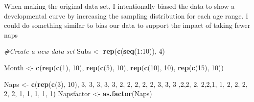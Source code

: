 \documentclass[]{book}
\newenvironment{Shaded}{\begin{snugshade}}{\end{snugshade}}
\newcommand{\CommentTok}[1]{\textcolor[rgb]{0.56,0.35,0.01}{\textit{#1}}}
\newcommand{\DecValTok}[1]{\textcolor[rgb]{0.00,0.00,0.81}{#1}}
\newcommand{\KeywordTok}[1]{\textcolor[rgb]{0.13,0.29,0.53}{\textbf{#1}}}
\newcommand{\NormalTok}[1]{#1}
\newcommand{\OperatorTok}[1]{\textcolor[rgb]{0.81,0.36,0.00}{\textbf{#1}}}
\newcommand{\StringTok}[1]{\textcolor[rgb]{0.31,0.60,0.02}{#1}}
\begin{document}
When making the original data set, I intentionally biased the data to show a developmental curve by increasing the sampling distribution for each age range. I could do something similar to bias our data to support the impact of taking fewer naps

\begin{Shaded}
\begin{Highlighting}[]
\CommentTok{#Create a new data set }
\NormalTok{Subs <-}\StringTok{ }\KeywordTok{rep}\NormalTok{(}\KeywordTok{c}\NormalTok{(}\KeywordTok{seq}\NormalTok{(}\DecValTok{1}\OperatorTok{:}\DecValTok{10}\NormalTok{)), }\DecValTok{4}\NormalTok{)}

\NormalTok{Month <-}\StringTok{ }\KeywordTok{c}\NormalTok{(}\KeywordTok{rep}\NormalTok{(}\KeywordTok{c}\NormalTok{(}\DecValTok{1}\NormalTok{), }\DecValTok{10}\NormalTok{), }\KeywordTok{rep}\NormalTok{(}\KeywordTok{c}\NormalTok{(}\DecValTok{5}\NormalTok{), }\DecValTok{10}\NormalTok{), }\KeywordTok{rep}\NormalTok{(}\KeywordTok{c}\NormalTok{(}\DecValTok{10}\NormalTok{), }\DecValTok{10}\NormalTok{), }\KeywordTok{rep}\NormalTok{(}\KeywordTok{c}\NormalTok{(}\DecValTok{15}\NormalTok{), }\DecValTok{10}\NormalTok{))}

\NormalTok{Naps <-}\StringTok{ }\KeywordTok{c}\NormalTok{(}\KeywordTok{rep}\NormalTok{(}\KeywordTok{c}\NormalTok{(}\DecValTok{3}\NormalTok{), }\DecValTok{10}\NormalTok{), }\DecValTok{3}\NormalTok{, }\DecValTok{3}\NormalTok{, }\DecValTok{3}\NormalTok{, }\DecValTok{3}\NormalTok{, }\DecValTok{3}\NormalTok{, }\DecValTok{2}\NormalTok{, }\DecValTok{2}\NormalTok{, }\DecValTok{2}\NormalTok{, }\DecValTok{2}\NormalTok{, }\DecValTok{2}\NormalTok{, }\DecValTok{3}\NormalTok{, }\DecValTok{3}\NormalTok{, }\DecValTok{3}\NormalTok{ ,}\DecValTok{2}\NormalTok{,}\DecValTok{2}\NormalTok{,  }\DecValTok{2}\NormalTok{, }\DecValTok{2}\NormalTok{,}\DecValTok{2}\NormalTok{,}\DecValTok{1}\NormalTok{, }\DecValTok{1}\NormalTok{, }\DecValTok{2}\NormalTok{, }\DecValTok{2}\NormalTok{, }\DecValTok{2}\NormalTok{, }\DecValTok{2}\NormalTok{, }\DecValTok{2}\NormalTok{, }\DecValTok{1}\NormalTok{, }\DecValTok{1}\NormalTok{, }\DecValTok{1}\NormalTok{, }\DecValTok{1}\NormalTok{, }\DecValTok{1}\NormalTok{)}
\NormalTok{Napsfactor <-}\StringTok{ }\KeywordTok{as.factor}\NormalTok{(Naps)}


\end{Highlighting}
\end{Shaded}
\end{document}
